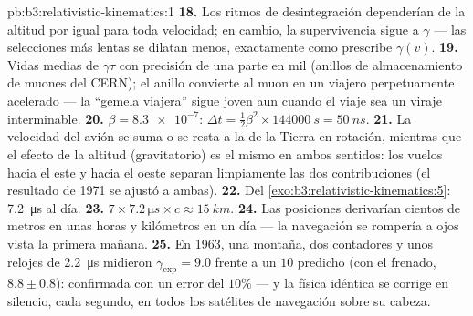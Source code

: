 \begin{solution}{pb:b3:relativistic-kinematics:1}
\textbf{18.} Los ritmos de desintegración dependerían de la altitud por
igual para toda velocidad; en cambio, la supervivencia sigue a $\gamma$ ---
las selecciones más lentas se dilatan menos, exactamente como prescribe
$\gamma(v)$.
\textbf{19.} Vidas medias de $\gamma\tau$ con precisión de una parte en
mil (anillos de almacenamiento de muones del CERN); el anillo convierte al
muon en un viajero perpetuamente acelerado --- la ``gemela viajera'' sigue
joven aun cuando el viaje sea un viraje interminable.
\textbf{20.} $\beta = \num{8.3e-7}$: $\Delta t = \tfrac12\beta^2
\times \qty{144000}{s} = \qty{50}{ns}$.
\textbf{21.} La velocidad del avión se suma o se resta a la de la Tierra en
rotación, mientras que el efecto de la altitud (gravitatorio) es el mismo en
ambos sentidos: los vuelos hacia el este y hacia el oeste separan
limpiamente las dos contribuciones (el resultado de 1971 se ajustó a ambas).
\textbf{22.} Del \cref{exo:b3:relativistic-kinematics:5}:
\qty{7.2}{\micro s} al día.
\textbf{23.} $7 \times 7.2\,\unit{\micro s} \times c \approx
\qty{15}{km}.$
\textbf{24.} Las posiciones derivarían cientos de metros en unas horas y
kilómetros en un día --- la navegación se rompería a ojos vista la primera
mañana.
\textbf{25.} En 1963, una montaña, dos contadores y unos relojes de
\qty{2.2}{\micro s} midieron $\gamma_{\exp} = 9.0$ frente a un $10$
predicho (con el frenado, $8.8 \pm 0.8$):  confirmada
con un error del $10\%$ --- y la física idéntica se corrige en silencio,
cada segundo, en todos los satélites de navegación sobre su cabeza.
\end{solution}

